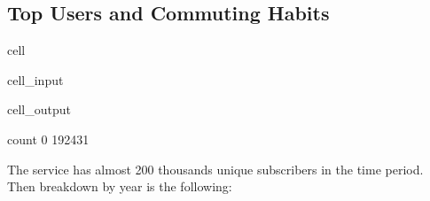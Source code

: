 \documentclass[letterpaper,10pt,english]{jupyterBook}
\begin{document}
\subsection{Top Users and Commuting Habits}
\label{\detokenize{03-data_ingestion_and_spatial_operations:top-users-and-commuting-habits}}
\begin{sphinxuseclass}{cell}
\begin{sphinxuseclass}{cell_input}
\begin{sphinxVerbatim}[commandchars=\\\{\}]
   
      

      


\end{sphinxVerbatim}

\end{sphinxuseclass}
\begin{sphinxuseclass}{cell_output}
\begin{sphinxVerbatim}[commandchars=\\\{\}]
    count
0  192431
\end{sphinxVerbatim}

\end{sphinxuseclass}
\end{sphinxuseclass}
\sphinxAtStartPar
The service has almost 200 thousands unique subscribers in the time period. Then breakdown by year is the following:
\end{document}
